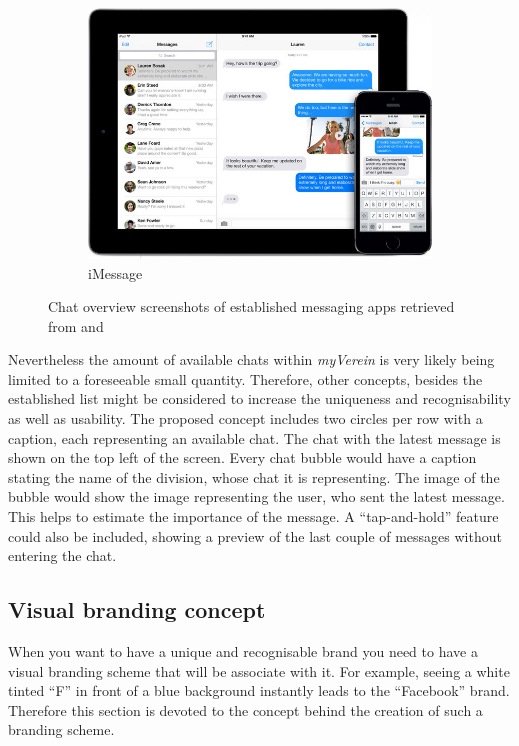 \begin{figure}[h]
\begin{subfigure}{.66\textwidth}
  		\includegraphics[width=0.98\linewidth]{./images/imessage-screen.jpg}
  		\caption{iMessage}
  		\label{fig:ChatiMessage}
	\end{subfigure}
	\caption{Chat overview screenshots of established messaging apps retrieved from \cite{Inc.:2015aa} and \cite{Stuckler:2013aa}}
	\label{fig:ChatScreens}
\end{figure}
\nocite{Inc.:2015aa, Stuckler:2013aa}

Nevertheless the amount of available chats within \emph{myVerein} is very likely being limited to a foreseeable small quantity. Therefore, other concepts, besides the established list might be considered to increase the uniqueness and recognisability as well as usability. The proposed concept includes two circles per row with a caption, each representing an available chat. The chat with the latest message is shown on the top left of the screen. Every chat bubble would have a caption stating the name of the division, whose chat it is representing. The image of the bubble would show the image representing the user, who sent the latest message. This helps to estimate the importance of the message. A \enquote{tap-and-hold} feature could also be included, showing a preview of the last couple of messages without entering the chat.

\subsection{Visual branding concept}
\label{sec:BrandingConcept}

When you want to have a unique and recognisable brand you need to have a visual branding scheme that will be associate with it. For example, seeing a white tinted \enquote{F} in front of a blue background instantly leads to the \enquote{Facebook} brand. Therefore this section is devoted to the concept behind the creation of such a branding scheme. 

